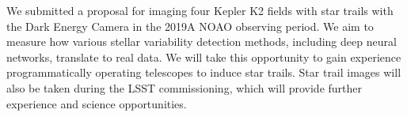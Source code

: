 \documentclass[12pt, letterpaper]{article}
\begin{document}
We submitted a proposal for imaging four Kepler K2 fields with star trails with the Dark Energy Camera in the 2019A NOAO observing period. We aim to measure how various stellar variability detection methods, including deep neural networks, translate to real data. We will take this opportunity to gain experience programmatically operating telescopes to induce star trails. Star trail images will also be taken during the LSST commissioning, which will provide further experience and science opportunities.



\end{document}

